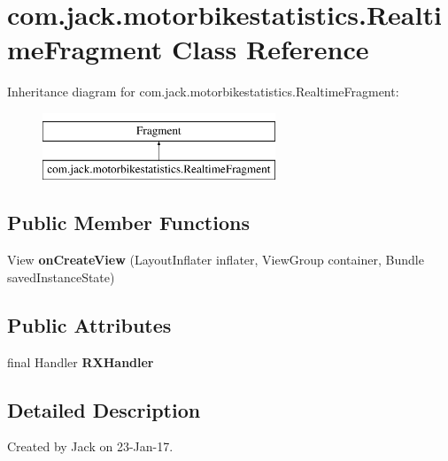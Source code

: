 \hypertarget{classcom_1_1jack_1_1motorbikestatistics_1_1_realtime_fragment}{}\section{com.\+jack.\+motorbikestatistics.\+Realtime\+Fragment Class Reference}
\label{classcom_1_1jack_1_1motorbikestatistics_1_1_realtime_fragment}
Inheritance diagram for com.\+jack.\+motorbikestatistics.\+Realtime\+Fragment\+:\begin{figure}[H]
\begin{center}
\leavevmode
\includegraphics[height=2.000000cm]{classcom_1_1jack_1_1motorbikestatistics_1_1_realtime_fragment}
\end{center}
\end{figure}
\subsection*{Public Member Functions}
\begin{DoxyCompactItemize}
\item 
\mbox{\label{classcom_1_1jack_1_1motorbikestatistics_1_1_realtime_fragment_a68850ca4bf4eabcdf4ed4005d5f0d4d7}} 
View {\bfseries on\+Create\+View} (Layout\+Inflater inflater, View\+Group container, Bundle saved\+Instance\+State)
\end{DoxyCompactItemize}
\subsection*{Public Attributes}
\begin{DoxyCompactItemize}
\item 
final Handler {\bfseries R\+X\+Handler}
\end{DoxyCompactItemize}


\subsection{Detailed Description}
Created by Jack on 23-\/\+Jan-\/17. 

